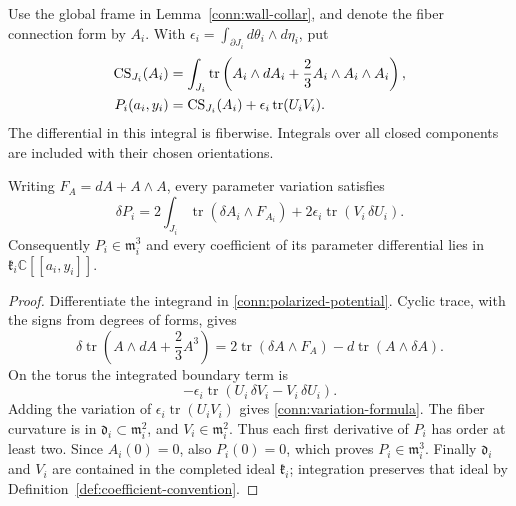 \begin{definition}
\label{conn:potential-definition}
Use the global frame in Lemma~\ref{conn:wall-collar}, and denote
the fiber connection form by \(A_i\).  With
\(\epsilon_i=\int_{\partial J_i}d\theta_i\wedge d\eta_i\), put
\begin{align}
 \operatorname{CS}_{J_i}(A_i)
   &=\int_{J_i}\operatorname{tr}
        \left(A_i\wedge dA_i+\frac23 A_i\wedge A_i\wedge A_i\right),
       \notag\\
 P_i(a_i,y_i)
   &=\operatorname{CS}_{J_i}(A_i)
                  +\epsilon_i\operatorname{tr}(U_iV_i).
 \label{conn:polarized-potential}
\end{align}
The differential in this integral is fiberwise.  Integrals over
all closed components are included with their chosen orientations.
\end{definition}

\begin{lemma}
\label{conn:variation}
Writing \(F_A=dA+A\wedge A\), every parameter variation satisfies
\begin{equation}
 \delta P_i
   =2\int_{J_i}\operatorname{tr}(\delta A_i\wedge F_{A_i})
          +2\epsilon_i\operatorname{tr}(V_i\,\delta U_i).
 \label{conn:variation-formula}
\end{equation}
Consequently \(P_i\in\mathfrak m_i^3\) and every coefficient of
its parameter differential lies in
\(\mathfrak k_i\mathbb C[[a_i,y_i]]\).
\end{lemma}

\begin{proof}
Differentiate the integrand in
\eqref{conn:polarized-potential}.  Cyclic trace, with the signs
from degrees of forms, gives
\[
 \delta\operatorname{tr}
      \left(A\wedge dA+\frac23 A^3\right)
  =2\operatorname{tr}(\delta A\wedge F_A)
                           -d\operatorname{tr}(A\wedge\delta A).
\]
On the torus the integrated boundary term is
\[
 -\epsilon_i\operatorname{tr}
                 (U_i\,\delta V_i-V_i\,\delta U_i).
\]
Adding the variation of
\(\epsilon_i\operatorname{tr}(U_iV_i)\) gives
\eqref{conn:variation-formula}.
The fiber curvature is in \(\mathfrak d_i\subset\mathfrak m_i^2\),
and \(V_i\in\mathfrak m_i^2\).  Thus each first derivative of
\(P_i\) has order at least two.  Since \(A_i(0)=0\), also
\(P_i(0)=0\), which proves \(P_i\in\mathfrak m_i^3\).
Finally \(\mathfrak d_i\) and \(V_i\) are contained in the
completed ideal \(\mathfrak k_i\); integration preserves that
ideal by Definition~\ref{def:coefficient-convention}.
\end{proof}

